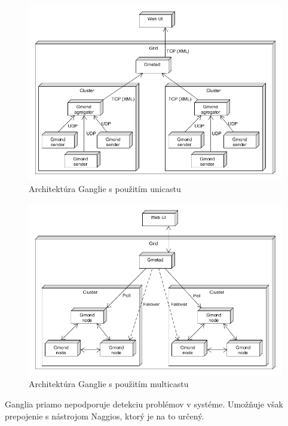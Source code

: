 \documentclass[a4paper, usesections, upjsfrontpage, thesismargins, thesislinespacing, twoside]{rnthesissvk}
\begin{document}
\begin{figure}
	\begin{center}
		\includegraphics[scale=0.55]{ganglia-architecture.png}
	\end{center}
	\caption{Architektúra Ganglie s použitím unicastu}
\end{figure}

\begin{figure}
	\begin{center}
		\includegraphics[scale=0.55]{ganglia-architecture-multicast.png}
	\end{center}
	\caption{Architektúra Ganglie s použitím multicastu}
\end{figure}


Ganglia priamo nepodporuje detekciu problémov v systéme.
Umožňuje však prepojenie s nástrojom Naggios, ktorý je na to určený.
\end{document}
